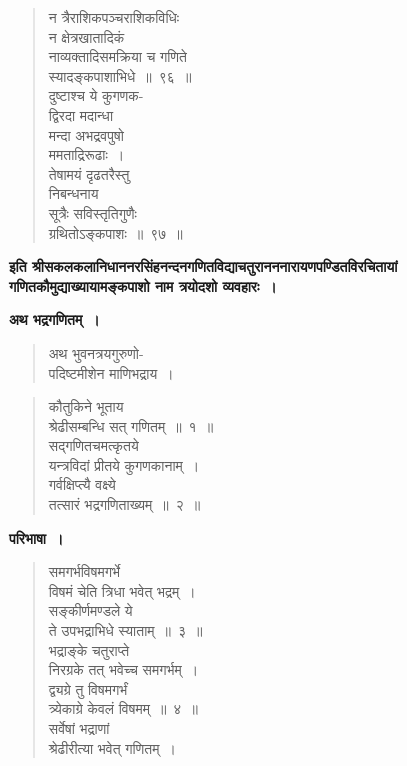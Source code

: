 \documentclass[11pt, openany]{book}
\begin{document}
\newpage

\begin{quote}
{\gk न त्रैराशिकपञ्चराशिकविधिः\\
	न क्षेत्रखातादिकं\\
	नाव्यक्तादिसमक्रिया च गणिते\\
	स्यादङ्कपाशाभिधे~॥~९६~॥\\
	दुष्टाश्च ये कुगणक-\\
	द्विरदा मदान्धा\\
	मन्दा अभद्रवपुषो\\
	ममताद्रिरूढाः~।\\
	तेषामयं दृढतरैस्तु\\
	निबन्धनाय\\
	सूत्रैः सविस्तृतिगुणैः\\
	ग्रथितोऽङ्कपाशः~॥~९७~॥}
\end{quote}
\vspace{-1mm}

\begin{center}
\textbf{इति श्रीसकलकलानिधाननरसिंहनन्दनगणितविद्याचतुरानननारायणपण्डितविरचितायां गणितकौमुद्याख्यायामङ्कपाशो नाम त्रयोदशो व्यवहारः~।}\\
\vspace{8mm}

 \label{ch14}
{\Large \textbf{अथ भद्रगणितम्~।}}
\end{center} 

\begin{quote}
{\gk अथ भुवनत्रयगुरुणो-\\
पदिष्टमीशेन माणिभद्राय~।}	
\end{quote}

\newpage

\begin{quote}
{\gk कौतुकिने भूताय\\
श्रेढीसम्बन्धि सत् गणितम्~॥~१~॥\\
सद्गणितचमत्कृतये\\
यन्त्रविदां प्रीतये कुगणकानाम्~।\\
गर्वक्षिप्त्यै वक्ष्ये\\
तत्सारं भद्रगणिताख्यम्~॥~२~॥}
\end{quote}

\textbf{परिभाषा~।}

\begin{quote}
{\gk समगर्भविषमगर्भे\\
विषमं चेति त्रिधा भवेत् भद्रम्~।\\
सङ्कीर्णमण्डले ये\\
ते उपभद्राभिधे स्याताम्~॥~३~॥\\
भद्राङ्के चतुराप्ते\\
निरग्रके तत् भवेच्च समगर्भम्~।\\
द्व्यग्रे तु विषमगर्भं\\
त्र्येकाग्रे केवलं विषमम्~॥~४~॥\\
सर्वेषां भद्राणां\\
श्रेढीरीत्या भवेत् गणितम्~।}
\end{quote}
\end{document}
